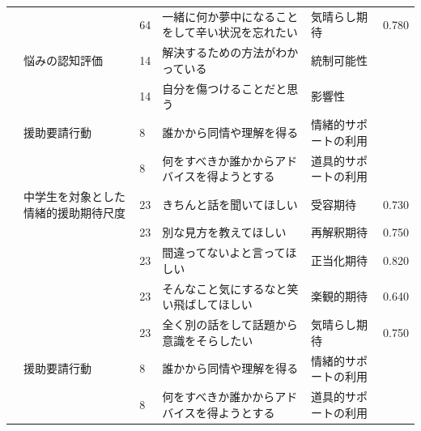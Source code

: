 \begin{landscape}
\begin{longtable}{p{2cm}p{2cm}p{2cm}p{6cm}p{2cm}p{2cm}}
		                         &                                  & 64  & 一緒に何か夢中になることをして辛い状況を忘れたい                            & 気晴らし期待               & 0.780      \\
		                         & 悩みの認知評価                          & 14  & 解決するための方法がわかっている                                    & 統制可能性                &            \\
		                         &                                  & 14  & 自分を傷つけることだと思う                                       & 影響性                  &            \\
		                         & 援助要請行動                           & 8   & 誰かから同情や理解を得る                                        & 情緒的サポートの利用           &            \\
		                         &                                  & 8   & 何をすべきか誰かからアドバイスを得ようとする                              & 道具的サポートの利用           &            \\
		                         & 中学生を対象とした情緒的援助期待尺度               & 23  & きちんと話を聞いてほしい                                        & 受容期待                 & 0.730      \\
		                         &                                  & 23  & 別な見方を教えてほしい                                         & 再解釈期待                & 0.750      \\
		                         &                                  & 23  & 間違ってないよと言ってほしい                                      & 正当化期待                & 0.820      \\
		                         &                                  & 23  & そんなこと気にするなと笑い飛ばしてほしい                                & 楽観的期待                & 0.640      \\
		                         &                                  & 23  & 全く別の話をして話題から意識をそらしたい                                & 気晴らし期待               & 0.750      \\
		                         & 援助要請行動                           & 8   & 誰かから同情や理解を得る                                        & 情緒的サポートの利用           &            \\
		                         &                                  & 8   & 何をすべきか誰かからアドバイスを得ようとする                              & 道具的サポートの利用           &            \\

\end{longtable}
\end{landscape}
